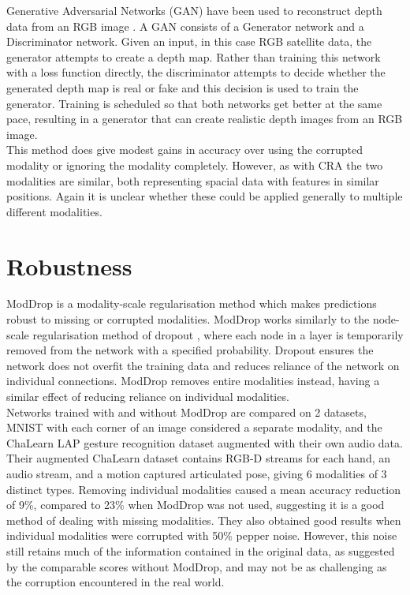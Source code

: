 Generative Adversarial Networks (GAN) have been used to reconstruct depth data from an RGB image \cite{GANFootprint}. A GAN consists of a Generator network and a Discriminator network. Given an input, in this case RGB satellite data, the generator attempts to create a depth map. Rather than training this network with a loss function directly, the discriminator attempts to decide whether the generated depth map is real or fake and this decision is used to train the generator. Training is scheduled so that both networks get better at the same pace, resulting in a generator that can create realistic depth images from an RGB image. \\

This method does give modest gains in accuracy over using the corrupted modality or ignoring the modality completely. However, as with CRA the two modalities are similar, both representing spacial data with features in similar positions. Again it is unclear whether these could be applied generally to multiple different modalities.\\

\section{Robustness}
ModDrop \cite{ModDrop} is a modality-scale regularisation method which makes predictions robust to missing or corrupted modalities. ModDrop works similarly to the node-scale regularisation method of dropout \cite{dropout}, where each node in a layer is temporarily removed from the network with a specified probability. Dropout ensures the network does not overfit the training data and reduces reliance of the network on individual connections. ModDrop removes entire modalities instead, having a similar effect of reducing reliance on individual modalities.\\

Networks trained with and without ModDrop are compared on 2 datasets, MNIST with each corner of an image considered a separate modality, and the ChaLearn LAP gesture recognition dataset augmented with their own audio data. Their augmented ChaLearn dataset contains RGB-D streams for each hand, an audio stream, and a motion captured articulated pose, giving 6 modalities of 3 distinct types. Removing individual modalities caused a mean accuracy reduction of 9\%, compared to 23\% when ModDrop was not used, suggesting it is a good method of dealing with missing modalities. They also obtained good results when individual modalities were corrupted with 50\% pepper noise. However, this noise still retains much of the information contained in the original data, as suggested by the comparable scores without ModDrop, and may not be as challenging as the corruption encountered in the real world.\\
